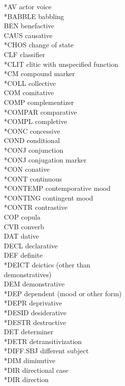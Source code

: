 \documentclass[a4paper, 11pt]{book}
\begin{document}
\begin{multicols}{2}
\begin{tabbing}
	*AV \> actor voice \\
	*BABBLE \> babbling \\
	BEN \> benefactive \\
	CAUS \> causative \\
	*CHOS \> change of state \\
	CLF	\> classifier \\
	*CLIT \> clitic with unspecified function \\
	*CM \> compound marker \\
	*COLL \> collective \\
	COM \> comitative \\
	COMP \> complementizer \\
	*COMPAR \> comparative \\
	*COMPL \> completive \\
	*CONC \> concessive \\
	COND \> conditional \\
	*CONJ \> conjunction \\
	*CONJ \> conjugation marker \\
	*CON \> conative \\
	*CONT \> continuous \\
	*CONTEMP \> contemporative mood \\
	*CONTING \> contingent mood \\
	*CONTR \> contrastive \\
	COP \> copula \\
	CVB \> converb \\
	DAT \> dative \\
	DECL \> declarative \\
	DEF \> definite \\
	*DEICT \> deictics (other than\\
		\> demonstratives) \\
	DEM \> demonstrative \\
	*DEP \> dependent (mood or other form) \\
	*DEPR \> deprivative \\
	*DESID \> desiderative \\
	*DESTR \> destructive \\
	DET \> determiner \\
	*DETR \> detransitivization \\
	*DIFF.SBJ \> different subject \\
	*DIM \> diminutive \\
	*DIR \> directional case \\
	*DIR \> direction \\

\end{tabbing}
\end{multicols}
\end{document}
